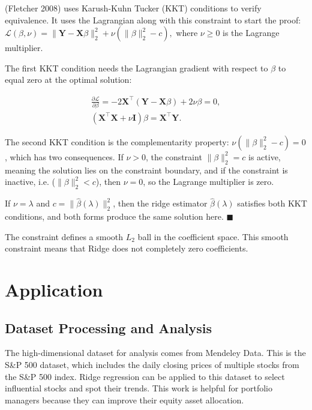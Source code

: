 \documentclass[12pt]{report} %
\begin{document}
\noindent (Fletcher 2008) uses Karush-Kuhn Tucker (KKT) conditions to verify equivalence. It uses the Lagrangian along with this constraint to start the proof: \\ $
\mathcal{L}(\beta, \nu) = \| \mathbf{Y} - \mathbf{X}\beta \|_2^2 + \nu \left( \|\beta\|_2^2 - c \right),$ where \(\nu \geq 0\) is the Lagrange multiplier. 

The first KKT condition needs the Lagrangian gradient with respect to \(\beta\) to equal zero at the optimal solution:

\begin{align*}
    \frac{\partial \mathcal{L}}{\partial \beta} = -2\mathbf{X}^\top (\mathbf{Y} - \mathbf{X}\beta) + 2\nu\beta = 0, \\
(\mathbf{X}^\top \mathbf{X} + \nu \mathbf{I})\beta = \mathbf{X}^\top \mathbf{Y}.
\end{align*}

\noindent The second KKT condition is the complementarity property: $\nu (\|\beta\|_2^2 - c) = 0$, which has two consequences. If \(\nu > 0\), the constraint \(\|\beta\|_2^2 = c\) is active, meaning the solution lies on the constraint boundary, and if the constraint is inactive, i.e. (\(\|\beta\|_2^2 < c\)), then \(\nu = 0\), so the Lagrange multiplier is zero.\cite{fletcher2000practical} 

If \(\nu = \lambda\) and \(c = \|\hat{\beta}(\lambda)\|_2^2\), then the ridge estimator \(\hat{\beta}(\lambda)\) satisfies both KKT conditions, and both forms produce the same solution here.\cite{fletcher2000practical} \quad $\blacksquare$

The constraint defines a smooth $L_2$ ball in the coefficient space. This smooth constraint means that Ridge does not completely zero coefficients.\cite{hailiang2023} 


\section{Application}
\subsection{Dataset Processing and Analysis}
The high-dimensional dataset for analysis comes from Mendeley Data.\cite{mendeleydata} This is the S\&P 500 dataset, which includes the daily closing prices of multiple stocks from the S\&P 500 index. Ridge regression can be applied to this dataset to select influential stocks and spot their trends. This work is helpful for portfolio managers because they can improve their equity asset allocation.
\end{document}
